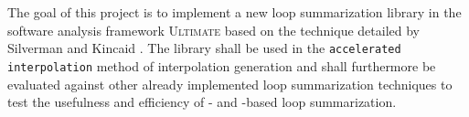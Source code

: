 
The goal of this project is to implement a new loop summarization library in the software analysis framework \textsc{Ultimate}\cite{Zitat02} based on the technique detailed by Silverman and Kincaid \cite{DBLP:conf/cav/SilvermanK19}. The library shall be used in the \texttt{accelerated interpolation} method of interpolation generation and shall furthermore be evaluated against other already implemented loop summarization techniques to test the usefulness and efficiency of \qvasr- and \qvasrs-based loop summarization.
